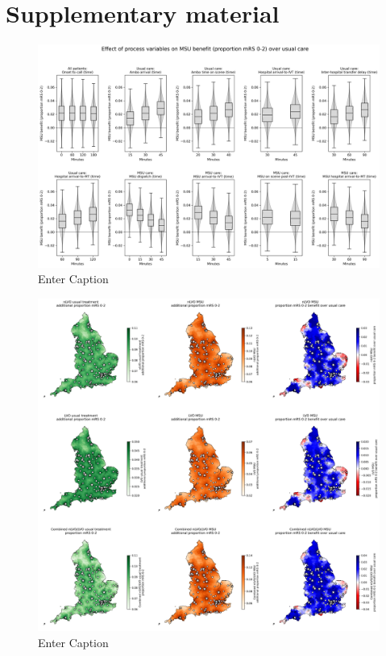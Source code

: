 \section{Supplementary material}







\begin{figure}
    \centering
    \includegraphics[width=1\linewidth]{images/msu_net_mrs_0-2_benefit.png}
    \caption{Enter Caption}
    \label{fig:enter-label}
\end{figure}

\begin{figure}
    \centering
    \includegraphics[width=1\linewidth]{images/map_mrs_0_2.jpg}
    \caption{Enter Caption}
    \label{fig:enter-label}
\end{figure}

